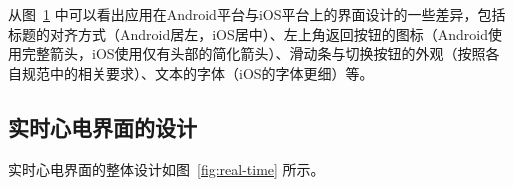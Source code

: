 \begin{figure}[ht]
    \label{fig:android-ios}
\end{figure}

从图~\ref{fig:android-ios} 中可以看出应用在Android平台与iOS平台上的界面设计的一些差异，包括标题的对齐方式（Android居左，iOS居中）、左上角返回按钮的图标（Android使用完整箭头，iOS使用仅有头部的简化箭头）、滑动条与切换按钮的外观（按照各自规范中的相关要求）、文本的字体（iOS的字体更细）等。

\subsection{实时心电界面的设计}\label{subsec:real-time-design}

实时心电界面的整体设计如图~\ref{fig:real-time} 所示。

